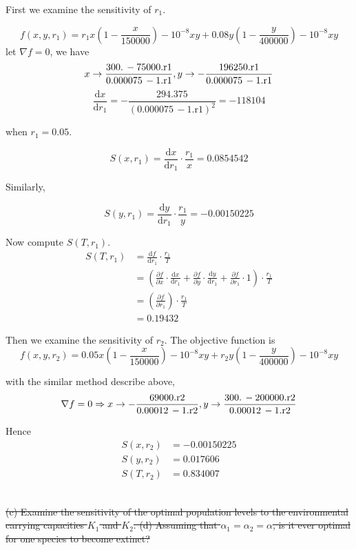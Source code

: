 \documentclass[11pt]{article}
\begin{document}
First we examine the sensitivity of $r_1$.

$$
f(x,y,r_1) =  r_1 x\left(1-\frac{x}{150000}\right)-10^{-8} x y + 0.08 y\left(1-\frac{y}{400000}\right)-10^{-8} x y
$$
let $\nabla f = 0$, we have
$$
\begin{align}
	x\to \frac{300.\, -75000. \text{r1}}{0.000075\, -1. \text{r1}},y\to -\frac{196250. \text{r1}}{0.000075\, -1. \text{r1}}
\end{align}
\\
$$
$$
\frac{\mathrm d x}{\mathrm d r_1}  =-\frac{294.375}{(0.000075\, -1. \text{r1})^2} = -118104
$$


when $r_1 = 0.05$.

$$
S(x,r_1) = \frac{\mathrm d x}{\mathrm d r_1} \cdot \frac{r_1}{x} = 0.0854542
$$


Similarly, 


$$
S(y,r_1) = \frac{\mathrm d y}{\mathrm d r_1} \cdot \frac{r_1}{y} = -0.00150225
$$


Now compute $S(T,r_1)$.
$$
\begin{align*}
S(T,r_1) &= 
\frac{\mathrm d f}{\mathrm d r_1}\cdot \frac{r_1}{T}
 \\
&=\left( \frac{\partial f}{\partial x}\cdot \frac{\mathrm d x}{\mathrm d r_1}  + \frac{\partial f}{\partial y}\cdot \frac{\mathrm d y}{\mathrm d r_1} + \frac{\partial f}{\partial r_1}\cdot 1 \right)\cdot \frac{r_1}{T}
\\
&=\left(  \frac{\partial f}{\partial r_1} \right)\cdot \frac{r_1}{T}
\\
&= 0.19432
  \end{align*}
$$

Then we examine the sensitivity of $r_2$. The objective function is
$$
f(x,y,r_2) =  0.05 x\left(1-\frac{x}{150000}\right)-10^{-8} x y + r_2 y\left(1-\frac{y}{400000}\right)-10^{-8} x y
$$


with the similar method describe above,
$$
\nabla f = 0 \Rightarrow x\to -\frac{69000. \text{r2}}{0.00012\, -1. \text{r2}},y\to \frac{300.\, -200000. \text{r2}}{0.00012\, -1. \text{r2}} 
\\
$$


Hence
$$
\begin{align}
	S(x,r_2) & = -0.00150225\\
	S(y,r_2) & = 0.017606\\
	S(T,r_2) &  = 0.834007
\end{align}
$$

\\
\sout{
(c) Examine the sensitivity of the optimal population levels to the environmental carrying capacities $K_{1}$ and $K_{2}$.
(d) Assuming that $\alpha_{1}=\alpha_{2}=\alpha$, is it ever optimal for one species to become extinct?
}
\end{document}
